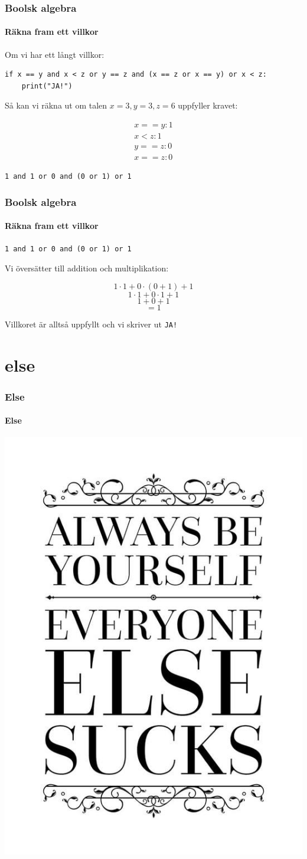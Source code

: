 \documentclass{beamer}
\begin{document}
\begin{frame}[fragile]
	\frametitle{Boolsk algebra}
	\framesubtitle{Räkna fram ett villkor}
	
	Om vi har ett långt villkor:
	
	\begin{lstlisting}
if x == y and x < z or y == z and (x == z or x == y) or x < z:
    print("JA!")
	\end{lstlisting}
	
	Så kan vi räkna ut om talen \(x=3, y=3, z=6\) uppfyller kravet:
	
	\[
		\begin{split}
			x == y: 1\\
			x < z: 1\\
			y == z: 0\\
			x == z: 0
		\end{split}
	\]
	
	\texttt{1 and 1 or 0 and (0 or 1) or 1}
	
\end{frame}

\begin{frame}
	\frametitle{Boolsk algebra}
	\framesubtitle{Räkna fram ett villkor}
	
	\texttt{1 and 1 or 0 and (0 or 1) or 1}
	
	Vi översätter till addition och multiplikation:
	
	\[
		1\cdot 1 + 0\cdot(0+1)+1
	\]
	\[
		1\cdot1+0\cdot1+1
	\]
	\[
		1+0+1
	\]\pause
	\[
		= 1
	\]
	
	Villkoret är alltså uppfyllt och vi skriver ut \texttt{JA!}

\end{frame}

{

\section{else}

\begin{frame}
	\frametitle{Else}
	\framesubtitle{Else}
	
	\begin{center}
	\includegraphics[width=.45\textwidth]{sucks.jpeg}
	\end{center}

\end{frame}
}
\end{document}
